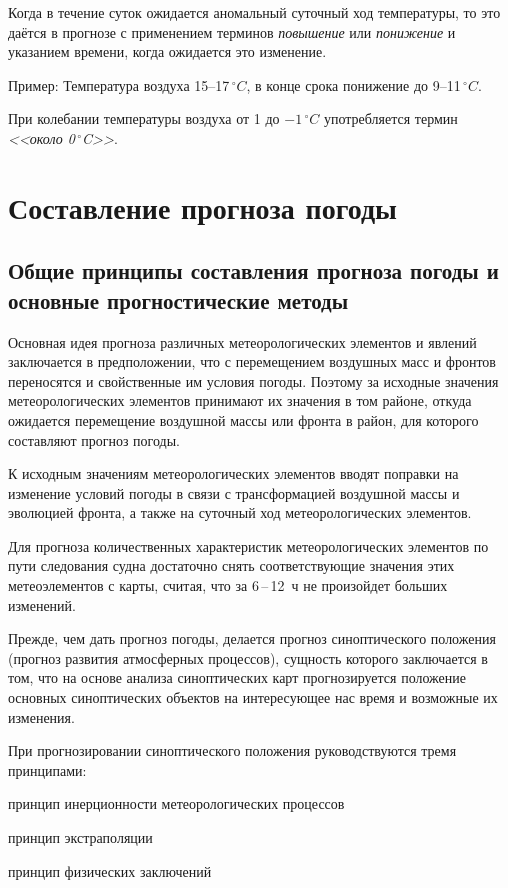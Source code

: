 \documentclass[a4paper, 12pt, twoside, final, book, russian, fittopage, cyremdash, openright]{ncc}
\newcommand{\otdo}{\,--\,}
\newcommand{\gr}{\ensuremath{\,^\circ}\xspace}
\newcommand{\grC}{\ensuremath{\,^\circ{}C}\xspace}
\begin{document}
Когда в течение суток ожидается аномальный суточный ход температуры,
то это даётся в прогнозе с применением терминов \textit{повышение} или
\textit{понижение} и указанием времени, когда ожидается это изменение.

Пример: Температура воздуха 15--17\grC, в конце срока понижение до
9--11\grC.

При колебании температуры воздуха от 1 до $-1\grC$ употребляется
термин \textit{<<около 0\gr{}C>>}.

\chapter{Составление прогноза погоды}

\section{Общие принципы составления прогноза погоды и основные прогностические методы}

Основная идея прогноза различных метеорологических элементов и явлений
заключается в предположении, что с перемещением воздушных масс и
фронтов переносятся и свойственные им условия погоды. Поэтому за
исходные значения метеорологических элементов принимают их значения в
том районе, откуда ожидается перемещение воздушной массы или фронта в
район, для которого составляют прогноз погоды.

К исходным значениям метеорологических элементов вводят поправки на
изменение условий погоды в связи с трансформацией воздушной массы и
эволюцией фронта, а также на суточный ход метеорологических элементов.

Для прогноза количественных характеристик метеорологических элементов
по пути следования судна достаточно снять соответствующие значения
этих метеоэлементов с карты, считая, что за 6\otdo12~ч не произойдет
больших изменений.

Прежде, чем дать прогноз погоды, делается прогноз синоптического
положения (прогноз развития атмосферных процессов), сущность которого
заключается в том, что на основе анализа синоптических карт
прогнозируется положение основных синоптических объектов на
интересующее нас время и возможные их изменения.

При прогнозировании синоптического положения руководствуются тремя принципами:
\begin{enumerate*}[itemjoin={{; }}, label={\arabic*)}]
\item принцип инерционности метеорологических процессов
\item принцип экстраполяции
\item принцип физических заключений
\end{enumerate*}
\end{document}
